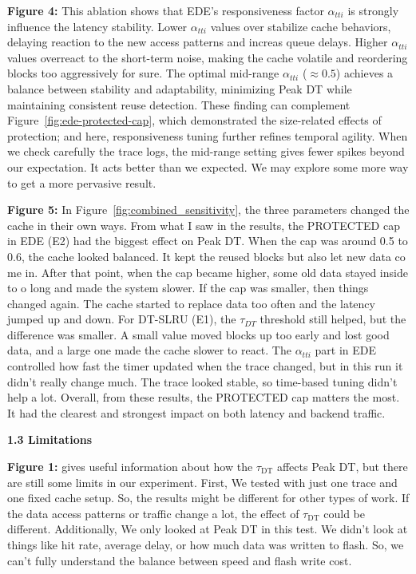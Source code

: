 \vspace{0.8em}
\textbf{Figure 4:} This ablation shows that EDE’s responsiveness factor $\alpha_{tti}$ is strongly influence the latency stability.
Lower $\alpha_{tti}$ values over stabilize cache behaviors, delaying reaction to the new access patterns and increas queue delays.
Higher $\alpha_{tti}$ values overreact to the short-term noise, making the cache volatile and reordering blocks too aggressively for sure.
The optimal mid-range $\alpha_{tti}$ ($\approx0.5$) achieves a balance between stability and adaptability, minimizing Peak DT while maintaining consistent reuse detection.
These finding can complement Figure~\ref{fig:ede-protected-cap}, which demonstrated the size-related effects of protection; and here, responsiveness tuning further refines temporal agility. When we check carefully the trace logs, the mid-range setting gives fewer spikes beyond our expectation. It acts better than we expected. We may explore some more way to get a more pervasive result. 

\vspace{0.8em}
\textbf{Figure 5:} In Figure~\ref{fig:combined_sensitivity}, the three parameters changed the cache in their own ways. From what I saw in the results, the PROTECTED cap in EDE (E2) had the biggest effect on Peak DT. When the cap was around 0.5 to 0.6, the cache looked balanced. It kept the reused blocks but also let new data co me in. After that point, when the cap became higher, some old data stayed inside to o long and made the system slower. If the cap was smaller, then things changed again. The cache started to replace data too often and the latency jumped up and down. For DT-SLRU (E1), the $\tau_{DT}$ threshold still helped, but the difference was smaller. A small value moved blocks up too early and lost good data, and a large one made the cache slower to react. The $\alpha_{tti}$ part in EDE controlled how fast the timer updated when the trace changed, but in this run it didn’t really change much. The trace looked stable, so time-based tuning didn’t help a lot. Overall, from these results, the PROTECTED cap matters the most. It had the clearest and strongest impact on both latency and backend traffic.


\vspace{2.0em}
\noindent\textbf{1.3 Limitations}  

\textbf{Figure 1:} gives useful information about how the $\tau_{\text{DT}}$ affects Peak DT, but there are still some limits in our experiment. First, We tested with just one trace and one fixed cache setup. So, the results might be different for other types of work. If the data access patterns or traffic change a lot, the effect of $\tau_{\text{DT}}$ could be different. Additionally, We only looked at Peak DT in this test. We didn’t look at things like hit rate, average delay, or how much data was written to flash. So, we can’t fully understand the balance between speed and flash write cost.

